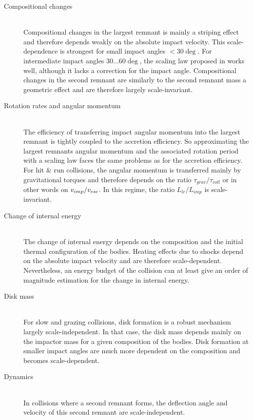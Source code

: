 \begin{description}
\item[Compositional changes] \hfill \\
Compositional changes in the largest remnant is mainly a striping effect and therefore depends weakly on the absolute impact velocity. This scale-dependence is strongest for small impact angles $< 30 \deg$. For intermediate impact angles $30 \dots 60 \deg$, the scaling law proposed in \cite{2009ApJ...700L.118M} works well, although it lacks a correction for the impact angle.
Compositional changes in the second remnant are similarly to the second remnant mass a geometric effect and are therefore largely scale-invariant.
\item[Rotation rates and angular momentum] \hfill \\ 
The efficiency of transferring impact angular momentum into the largest remnant is tightly coupled to the accretion efficiency. So approximating the largest remnants angular momentum and the associated rotation period with a scaling law faces the same problems as for the accretion efficiency. For hit \& run collisions, the angular momentum is transferred mainly by gravitational torques and therefore depends on the ratio $\tau_{grav} / \tau_{coll}$ or in other words on $v_{imp} / v_{esc}$. In this regime, the ratio $L_{lr} / L_{imp}$ is scale-invariant.
\item[Change of internal energy] \hfill \\ 
The change of internal energy depends on the composition and the initial thermal configuration of the bodies. Heating effects due to shocks depend on the absolute impact velocity and are therefore scale-dependent. Nevertheless, an energy budget of the collision can at least give an order of magnitude estimation for the change in internal energy.
\item[Disk mass] \hfill \\ 
For slow and grazing collisions, disk formation is a robust mechanism largely scale-independent. In that case, the disk mass depends mainly on the impactor mass for a given composition of the bodies. Disk formation at smaller impact angles are much more dependent on the composition and becomes scale-dependent.
\item[Dynamics] \hfill \\
In collisions where a second remnant forms, the deflection angle and velocity of this second remnant are scale-independent.
\end{description}










